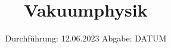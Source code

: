 

\subject{V70}
\title{Vakuumphysik}
\date{%
  Durchführung: 12.06.2023
  \hspace{3em}
  Abgabe: DATUM
}



\maketitle
\thispagestyle{empty}
\tableofcontents
\newpage






\printbibliography{}


